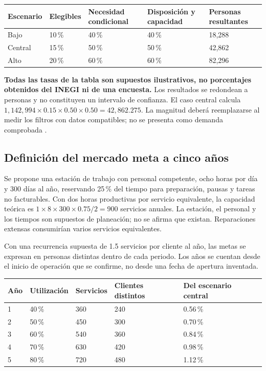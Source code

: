 {\begin{longtable}{p{.14\linewidth}p{.14\linewidth}p{.16\linewidth}p{.20\linewidth}p{.19\linewidth}}
\toprule
\textbf{Escenario} & \textbf{Elegibles} & \textbf{Necesidad condicional} & \textbf{Disposición y capacidad} & \textbf{Personas resultantes}\\
\midrule
Bajo & 10\,\% & 40\,\% & 40\,\% & 18,288\\
Central & 15\,\% & 50\,\% & 50\,\% & 42,862\\
Alto & 20\,\% & 60\,\% & 60\,\% & 82,296\\
\bottomrule
\end{longtable}
\textbf{Todas las tasas de la tabla son supuestos ilustrativos, no porcentajes obtenidos del INEGI ni de una encuesta.} Los resultados se redondean a personas y no constituyen un intervalo de confianza. El caso central calcula $1{,}142{,}994\times0.15\times0.50\times0.50=42{,}862.275$. La magnitud deberá reemplazarse al medir los filtros con datos compatibles; no se presenta como demanda comprobada \citep{albrechtMarketing2023}.

\subsection{Definición del mercado meta a cinco años}

Se propone una estación de trabajo con personal competente, ocho horas por día y 300 días al año, reservando 25\,\% del tiempo para preparación, pausas y tareas no facturables. Con dos horas productivas por servicio equivalente, la capacidad teórica es $1\times8\times300\times0.75/2=900$ servicios anuales. La estación, el personal y los tiempos son supuestos de planeación; no se afirma que existan. Reparaciones extensas consumirían varios servicios equivalentes.

Con una recurrencia supuesta de 1.5 servicios por cliente al año, las metas se expresan en personas distintas dentro de cada periodo. Los años se cuentan desde el inicio de operación que se confirme, no desde una fecha de apertura inventada.
\begin{longtable}{p{.10\linewidth}p{.16\linewidth}p{.18\linewidth}p{.19\linewidth}p{.20\linewidth}}
\toprule
\textbf{Año} & \textbf{Utilización} & \textbf{Servicios} & \textbf{Clientes distintos} & \textbf{Del escenario central}\\
\midrule
1 & 40\,\% & 360 & 240 & 0.56\,\%\\
2 & 50\,\% & 450 & 300 & 0.70\,\%\\
3 & 60\,\% & 540 & 360 & 0.84\,\%\\
4 & 70\,\% & 630 & 420 & 0.98\,\%\\
5 & 80\,\% & 720 & 480 & 1.12\,\%\\
\bottomrule
\end{longtable}

}
